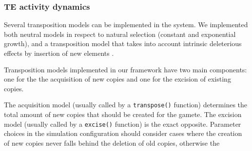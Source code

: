 \documentclass[10pt]{article}
\begin{document}

\subsubsection{TE activity dynamics}

Several transposition models can be implemented in the system. We
implemented both neutral models in respect to natural selection
(constant and exponential growth), and a transposition model that
takes into account intrinsic deleterious effects by insertion of new
elements \cite{SKR05}.

Transposition models implemented in our framework have two main
components: one for the the acquisition of new copies and one for the
excision of existing copies.

The acquisition model (usually called by a \verb|transpose()|
function) determines the total amount of new copies that should be
created for the gamete. The excision model (usually called by a
\verb|excise()| function) is the exact opposite. Parameter choices in
the simulation configuration should consider cases where the creation
of new copies never falls behind the deletion of old copies, otherwise
the 





\end{document}

